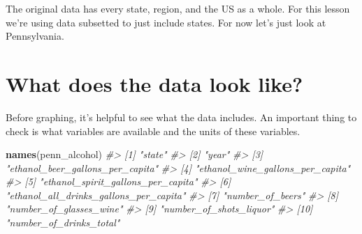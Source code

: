 \documentclass[
  12pt,
]{book}
\newenvironment{Shaded}{\begin{snugshade}}{\end{snugshade}}
\newcommand{\CommentTok}[1]{\textcolor[rgb]{0.37,0.37,0.37}{\textit{#1}}}
\newcommand{\KeywordTok}[1]{\textcolor[rgb]{0.27,0.27,0.27}{\textbf{#1}}}
\newcommand{\NormalTok}[1]{#1}
\newcommand{\OperatorTok}[1]{\textcolor[rgb]{0.43,0.43,0.43}{\textbf{#1}}}
\newcommand{\StringTok}[1]{\textcolor[rgb]{0.5,0.5,0.5}{#1}}
\begin{document}
The original data has every state, region, and the US as a whole. For this lesson we're using data subsetted to just include states. For now let's just look at Pennsylvania.

\begin{Shaded}
\end{Shaded}

\hypertarget{what-does-the-data-look-like}{%
\section{What does the data look like?}\label{what-does-the-data-look-like}}

Before graphing, it's helpful to see what the data includes. An important thing to check is what variables are available and the units of these variables.

\begin{Shaded}
\begin{Highlighting}[]
\KeywordTok{names}\NormalTok{(penn\_alcohol)}
\CommentTok{\#>  [1] "state"                                }
\CommentTok{\#>  [2] "year"                                 }
\CommentTok{\#>  [3] "ethanol\_beer\_gallons\_per\_capita"      }
\CommentTok{\#>  [4] "ethanol\_wine\_gallons\_per\_capita"      }
\CommentTok{\#>  [5] "ethanol\_spirit\_gallons\_per\_capita"    }
\CommentTok{\#>  [6] "ethanol\_all\_drinks\_gallons\_per\_capita"}
\CommentTok{\#>  [7] "number\_of\_beers"                      }
\CommentTok{\#>  [8] "number\_of\_glasses\_wine"               }
\CommentTok{\#>  [9] "number\_of\_shots\_liquor"               }
\CommentTok{\#> [10] "number\_of\_drinks\_total"}
\end{Highlighting}
\end{Shaded}
\end{document}
